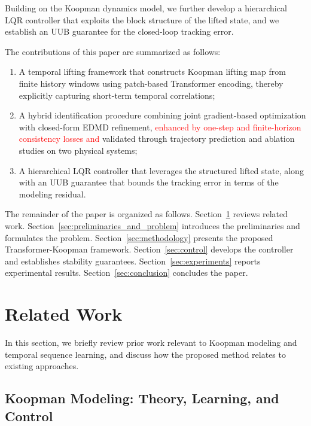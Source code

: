 \documentclass[journal]{IEEEtran}
\begin{document}
Building on the Koopman dynamics model, we further develop a hierarchical LQR controller that exploits  the block structure of the lifted state, and we establish an UUB guarantee for the closed-loop tracking error. 

The contributions of this paper are summarized as follows:
\begin{enumerate}
\item A temporal lifting framework that constructs Koopman lifting map from finite history windows using patch-based Transformer encoding, thereby explicitly capturing short-term temporal correlations;
\item A hybrid identification procedure combining joint gradient-based optimization with closed-form EDMD refinement, \textcolor{red}{enhanced by one-step and finite-horizon consistency losses and} validated through trajectory prediction and ablation studies on two physical systems;
\item A hierarchical LQR controller that leverages the structured lifted state, along with an UUB guarantee that bounds the tracking error in terms of the modeling residual.
\end{enumerate}

The remainder of the paper is organized as follows. Section~\ref{sec:related_work} reviews related work. Section~\ref{sec:preliminaries_and_problem} introduces the preliminaries and formulates the problem. Section~\ref{sec:methodology} presents the proposed Transformer-Koopman framework. Section~\ref{sec:control} develops the controller and establishes stability guarantees. Section~\ref{sec:experiments} reports experimental results. Section~\ref{sec:conclusion} concludes the paper.


\section{Related Work}
\label{sec:related_work}

In this section, we briefly review prior work relevant to Koopman modeling and temporal sequence learning, and  discuss how the proposed method relates to existing approaches.

\subsection{Koopman Modeling: Theory, Learning, and Control}
\end{document}
